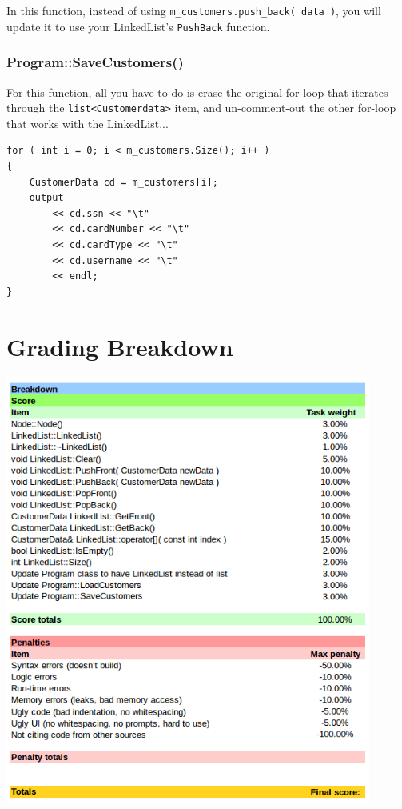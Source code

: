 \documentclass[a4paper,12pt,oneside]{book}
\begin{document}
        In this function, instead of using 
        \texttt{m\_customers.push\_back( data )}, you will update it
        to use your LinkedList's \texttt{PushBack} function.
        
        \subsection{Program::SaveCustomers()}

        For this function, all you have to do is erase the original
        for loop that iterates through the \texttt{list<Customerdata>}
        item, and un-comment-out the other for-loop that works
        with the LinkedList...
        
\begin{lstlisting}[style=code]
for ( int i = 0; i < m_customers.Size(); i++ )
{
    CustomerData cd = m_customers[i];
    output
        << cd.ssn << "\t"
        << cd.cardNumber << "\t"
        << cd.cardType << "\t"
        << cd.username << "\t"
        << endl;
}
\end{lstlisting} 

    \chapter{Grading Breakdown}
    
    \begin{center}
        \includegraphics[width=12cm]{images/gradesheet-project1.png}
    \end{center}
    
\end{document}
